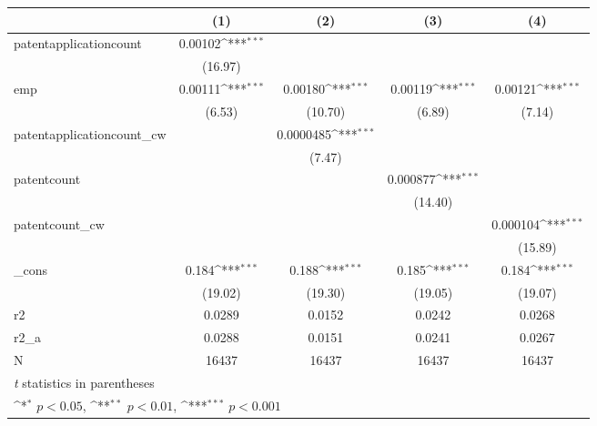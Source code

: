 {
\def\sym#1{\ifmmode^{#1}\else\(^{#1}\)\fi}
\begin{tabular}{l*{4}{c}}
\hline\hline
            &\multicolumn{1}{c}{(1)}         &\multicolumn{1}{c}{(2)}         &\multicolumn{1}{c}{(3)}         &\multicolumn{1}{c}{(4)}         \\
\hline
patentapplicationcount&     0.00102\sym{***}&                     &                     &                     \\
            &     (16.97)         &                     &                     &                     \\
[1em]
emp         &     0.00111\sym{***}&     0.00180\sym{***}&     0.00119\sym{***}&     0.00121\sym{***}\\
            &      (6.53)         &     (10.70)         &      (6.89)         &      (7.14)         \\
[1em]
patentapplicationcount\_cw&                     &   0.0000485\sym{***}&                     &                     \\
            &                     &      (7.47)         &                     &                     \\
[1em]
patentcount &                     &                     &    0.000877\sym{***}&                     \\
            &                     &                     &     (14.40)         &                     \\
[1em]
patentcount\_cw&                     &                     &                     &    0.000104\sym{***}\\
            &                     &                     &                     &     (15.89)         \\
[1em]
\_cons      &       0.184\sym{***}&       0.188\sym{***}&       0.185\sym{***}&       0.184\sym{***}\\
            &     (19.02)         &     (19.30)         &     (19.05)         &     (19.07)         \\
\hline
r2          &      0.0289         &      0.0152         &      0.0242         &      0.0268         \\
r2\_a        &      0.0288         &      0.0151         &      0.0241         &      0.0267         \\
N           &       16437         &       16437         &       16437         &       16437         \\
\hline\hline
\multicolumn{5}{l}{\footnotesize \textit{t} statistics in parentheses}\\
\multicolumn{5}{l}{\footnotesize \sym{*} \(p<0.05\), \sym{**} \(p<0.01\), \sym{***} \(p<0.001\)}\\
\end{tabular}
}

